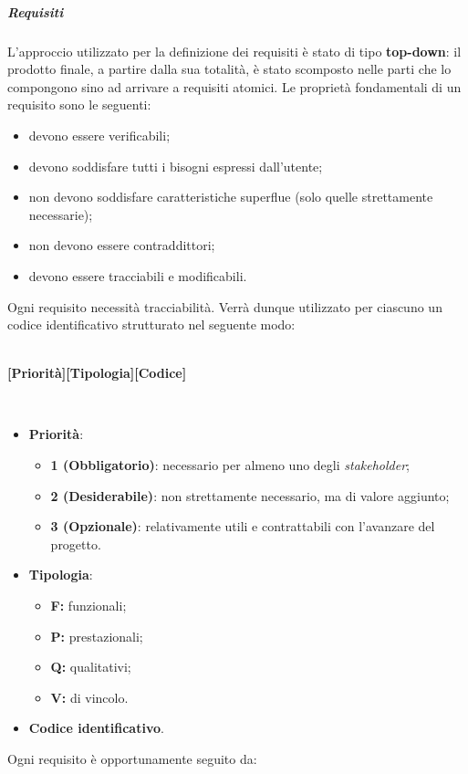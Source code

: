 \subparagraph*{Requisiti}
L'approccio utilizzato per la definizione dei requisiti è stato di tipo \textbf{top-down}: il prodotto finale, a partire dalla sua totalità, è stato scomposto nelle parti che lo compongono sino ad arrivare a requisiti atomici. Le proprietà fondamentali di un requisito sono le seguenti:
\begin{itemize}
	\item devono essere verificabili;
	\item devono soddisfare tutti i bisogni espressi dall'utente;
	\item non devono soddisfare caratteristiche superflue (solo quelle strettamente necessarie);
	\item non devono essere contraddittori;
	\item devono essere tracciabili e modificabili.
\end{itemize}  
\noindent Ogni requisito necessità tracciabilità. Verrà dunque utilizzato per ciascuno un codice identificativo strutturato nel seguente modo:
\\\\
\centerline{\textbf{[Priorità][Tipologia][Codice]}}\\
\begin{itemize}
  \item \textbf{Priorità}:
  \begin{itemize}
    \item \textbf{1 (Obbligatorio)}: necessario per almeno uno degli \textit{stakeholder\glos};
    \item \textbf{2 (Desiderabile)}: non strettamente necessario, ma di valore aggiunto;
    \item \textbf{3 (Opzionale)}: relativamente utili e contrattabili con l'avanzare del progetto.
  \end{itemize}
  \item \textbf{Tipologia}:
  \begin{itemize}
    \item \textbf{F:} funzionali;
    \item \textbf{P:} prestazionali;
    \item \textbf{Q:} qualitativi;
    \item \textbf{V:} di vincolo.
  \end{itemize}
  \item \textbf{Codice identificativo}.
\end{itemize}
Ogni requisito è opportunamente seguito da:
